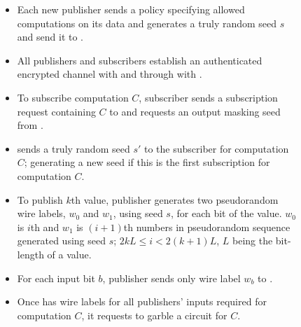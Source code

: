 \begin{figure}[h]
\begin{mdframed}[style=myframe]


\initialize
\begin{itemize}[leftmargin=*]
 
	\item Each new publisher sends \broker a policy specifying allowed
		computations on its data and generates a truly random seed $s$ and send
		it to \garbler.

	\item All publishers and subscribers establish an authenticated encrypted
		channel with \broker and through \broker with \garbler.

\end{itemize}

\subscribe
\begin{itemize}[leftmargin=*]

	\item To subscribe computation $C$, subscriber sends a subscription request
	  containing $C$ to \broker and requests an output masking seed from
	  \garbler.

	\item \garbler sends a truly random seed $s'$ to the subscriber for
		computation $C$; generating a new seed if this is the first subscription
		for computation $C$.

\end{itemize}

\publish
\begin{itemize}[leftmargin=*]
		
	\item To publish $k$th value, publisher generates two pseudorandom wire
		labels, $w_0$ and $w_1$, using seed $s$, for each bit of the value.  $w_0$
		is $i$th and $w_1$ is $(i+1)$th numbers in pseudorandom sequence generated
		using seed $s$; $2kL \leq i < 2(k+1)L$, $L$ being the bit-length of a
		value.

	\item For each input bit $b$, publisher sends only wire label $w_b$ to
		\broker.

\end{itemize}

\process
\begin{itemize}[leftmargin=*]

	\item Once \broker has wire labels for all publishers' inputs required for
		computation $C$, it requests \garbler to garble a circuit for $C$.  
  

\end{itemize}
\end{mdframed}
\end{figure}
